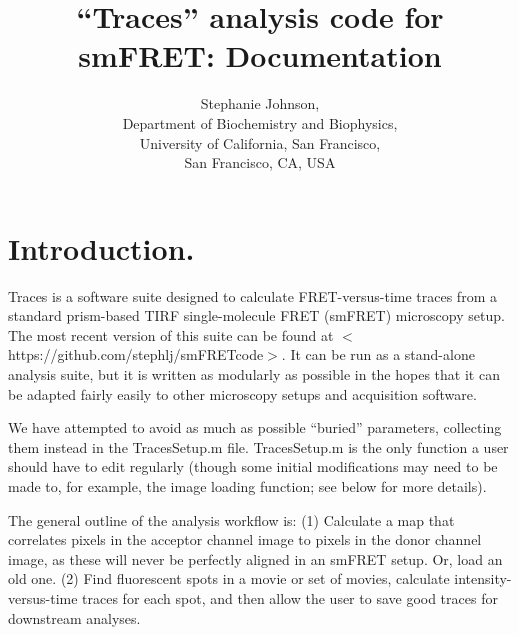 \documentclass[11pt]{article}
\begin{document}
\title{``Traces'' analysis code for smFRET: Documentation}

\author{%
Stephanie Johnson,\\Department of Biochemistry and
     Biophysics, \\University of California, San Francisco, \\San Francisco, CA, USA\\
}
\date{}

\maketitle

\tableofcontents

\newpage

\section{Introduction.}

Traces is a software suite designed to calculate FRET-versus-time traces from a standard prism-based TIRF single-molecule FRET (smFRET) microscopy setup.  The most recent version of this suite can be found at $<$https://github.com/stephlj/smFRETcode$>$.  It can be run as a stand-alone analysis suite, but it is written as modularly as possible in the hopes that it can be adapted fairly easily to other microscopy setups and acquisition software.  

We have attempted to avoid as much as possible ``buried'' parameters, collecting them instead in the TracesSetup.m file.  TracesSetup.m is the only function a user should have to edit regularly (though some initial modifications may need to be made to, for example, the image loading function; see below for more details). %

The general outline of the analysis workflow is: (1) Calculate a map that correlates pixels in the acceptor channel image to pixels in the donor channel image, as these will never be perfectly aligned in an smFRET setup. Or, load an old one. (2) Find fluorescent spots in a movie or set of movies, calculate intensity-versus-time traces for each spot, and then allow the user to save good traces for downstream analyses.
\end{document}
